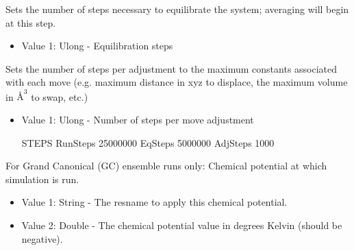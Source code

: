 \documentclass[letterpaper,10pt,english]{sphinxmanual}
\begin{document}
\begin{description}
\begin{itemize}
\end{itemize}

\item[{\sphinxcode{\sphinxupquote{EqSteps}}}] \leavevmode
Sets the number of steps necessary to equilibrate the system; averaging will begin at this step.
\begin{itemize}
\item {} 
Value 1: Ulong - Equilibration steps

\end{itemize}

\item[{\sphinxcode{\sphinxupquote{AdjSteps}}}] \leavevmode
Sets the number of steps per adjustment to the maximum constants associated with each move (e.g. maximum distance in xyz to displace, the maximum volume in \(Å^3\) to swap, etc.)
\begin{itemize}
\item {} 
Value 1: Ulong - Number of steps per move adjustment

%
\begin{sphinxVerbatim}[commandchars=\\\{\}]
\PYGZsh{}\PYGZsh{}\PYGZsh{}\PYGZsh{}\PYGZsh{}\PYGZsh{}\PYGZsh{}\PYGZsh{}\PYGZsh{}\PYGZsh{}\PYGZsh{}\PYGZsh{}\PYGZsh{}\PYGZsh{}\PYGZsh{}\PYGZsh{}\PYGZsh{}\PYGZsh{}\PYGZsh{}\PYGZsh{}\PYGZsh{}\PYGZsh{}\PYGZsh{}\PYGZsh{}\PYGZsh{}\PYGZsh{}\PYGZsh{}\PYGZsh{}\PYGZsh{}\PYGZsh{}\PYGZsh{}\PYGZsh{}\PYGZsh{}
\PYGZsh{} STEPS
\PYGZsh{}\PYGZsh{}\PYGZsh{}\PYGZsh{}\PYGZsh{}\PYGZsh{}\PYGZsh{}\PYGZsh{}\PYGZsh{}\PYGZsh{}\PYGZsh{}\PYGZsh{}\PYGZsh{}\PYGZsh{}\PYGZsh{}\PYGZsh{}\PYGZsh{}\PYGZsh{}\PYGZsh{}\PYGZsh{}\PYGZsh{}\PYGZsh{}\PYGZsh{}\PYGZsh{}\PYGZsh{}\PYGZsh{}\PYGZsh{}\PYGZsh{}\PYGZsh{}\PYGZsh{}\PYGZsh{}\PYGZsh{}\PYGZsh{}
RunSteps 25000000
EqSteps 5000000
AdjSteps 1000
\end{sphinxVerbatim}

\end{itemize}

\item[{\sphinxcode{\sphinxupquote{ChemPot}}}] \leavevmode
For Grand Canonical (GC) ensemble runs only: Chemical potential at which simulation is run.
\begin{itemize}
\item {} 
Value 1: String - The resname to apply this chemical potential.

\item {} 
Value 2: Double - The chemical potential value in degrees Kelvin (should be negative).


\end{itemize}
\end{description}
\end{document}
